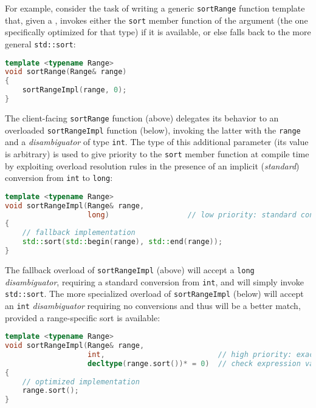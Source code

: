For example, consider the task of writing a generic \lstinline!sortRange!
function template that, given a , invokes either the
\lstinline!sort! member function of the argument (the one specifically
optimized for that type) if it is available, or else falls back to the more
general \lstinline!std::sort!:

\begin{lstlisting}[language=C++]
template <typename Range>
void sortRange(Range& range)
{
    sortRangeImpl(range, 0);
}
\end{lstlisting}
    
\noindent The client-facing \lstinline!sortRange! function (above) delegates its
behavior to an overloaded \lstinline!sortRangeImpl! function (below),
invoking the latter with the \lstinline!range! and a \emph{disambiguator}
of type \lstinline!int!. The type of this additional parameter (its value
is arbitrary) is used to give priority to the \lstinline!sort! member
function at compile time by exploiting overload resolution rules in
the presence of an implicit (\emph{standard}) conversion from
\lstinline!int! to \lstinline!long!:

\begin{lstlisting}[language=C++]
template <typename Range>
void sortRangeImpl(Range& range,
                   long)                  // low priority: standard conversion
{
    // fallback implementation
    std::sort(std::begin(range), std::end(range));
}
\end{lstlisting}
    
\noindent The fallback overload of \lstinline!sortRangeImpl! (above) will accept a
\lstinline!long! \emph{disambiguator}, requiring a standard conversion from
\lstinline!int!, and will simply invoke \lstinline!std::sort!. The more
specialized overload of \lstinline!sortRangeImpl! (below) will accept an
\lstinline!int! \emph{disambiguator} requiring no conversions and thus
will be a better match, provided a range-specific sort is available:

\begin{lstlisting}[language=C++]
template <typename Range>
void sortRangeImpl(Range& range,
                   int,                          // high priority: exact match
                   decltype(range.sort())* = 0)  // check expression validity
{
    // optimized implementation
    range.sort();
}
\end{lstlisting}
    
